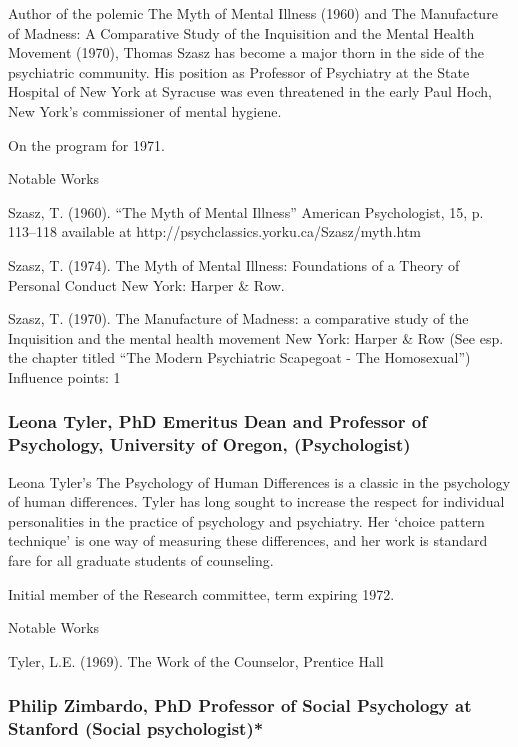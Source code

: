 Author of the polemic The Myth of Mental Illness (1960) and The Manufacture of Madness: A Comparative Study of the Inquisition and the Mental Health Movement (1970), Thomas Szasz has become a major thorn in the side of the psychiatric community. His position as Professor of Psychiatry at the State Hospital of New York at Syracuse was even threatened in the early Paul Hoch, New York’s commissioner of mental hygiene.

On the program for 1971.

Notable Works

Szasz, T. (1960). “The Myth of Mental Illness” American Psychologist, 15, p. 113--118 available at http:\slash \slash psychclassics.yorku.ca\slash Szasz\slash myth.htm

Szasz, T. (1974). The Myth of Mental Illness: Foundations of a Theory of Personal Conduct New York: Harper \& Row.

Szasz, T. (1970). The Manufacture of Madness: a comparative study of the Inquisition and the mental health movement New York: Harper \& Row (See esp. the chapter titled “The Modern Psychiatric Scapegoat - The Homosexual”)
Influence points: 1

\subsubsection{Leona Tyler, PhD Emeritus Dean and Professor of Psychology, University of Oregon, (Psychologist)}
\label{leonatylerphdemeritusdeanandprofessorofpsychologyuniversityoforegonpsychologist}

Leona Tyler's The Psychology of Human Differences is a classic in the psychology of human differences. Tyler has long sought to increase the respect for individual personalities in the practice of psychology and psychiatry. Her `choice pattern technique' is one way of measuring these differences, and her work is standard fare for all graduate students of counseling.

Initial member of the Research committee, term expiring 1972.

Notable Works

Tyler, L.E. (1969). The Work of the Counselor, Prentice Hall

\subsubsection{Philip Zimbardo, PhD Professor of Social Psychology at Stanford (Social psychologist)*}
\label{philipzimbardophdprofessorofsocialpsychologyatstanfordsocialpsychologist}

